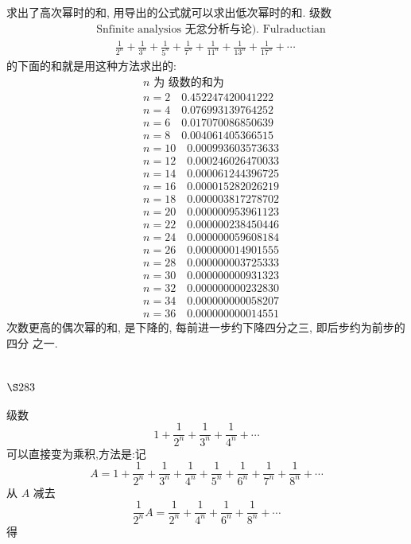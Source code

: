 求出了高次幂时的和, 用导出的公式就可以求出低次幂时的和. 级数 
\[
\begin{aligned}
& \text { Snfinite analysios 无忿分析与论). Fulraductian } \\
& \qquad \frac{1}{2^{n}}+\frac{1}{3^{n}}+\frac{1}{5^{n}}+\frac{1}{7^{n}}+\frac{1}{11^{n}}+\frac{1}{13^{n}}+\frac{1}{17^{n}}+\cdots
\end{aligned}
\]
的下面的和就是用这种方法求出的:
\[
\begin{aligned}
& n \text { 为 级数的和为 } \\
& n=2 \quad 0.452247420041222 \\
& n=4 \quad 0.076993139764252 \\
& n=6 \quad 0.017070086850639 \\
& n=8 \quad 0.004061405366515 \\
& n=10 \quad 0.000993603573633 \\
& n=12 \quad 0.000246026470033 \\
& n=14 \quad 0.000061244396725 \\
& n=16 \quad 0.000015282026219 \\
& n=18 \quad 0.000003817278702 \\
& n=20 \quad 0.000000953961123 \\
& n=22 \quad 0.000000238450446 \\
& n=24 \quad 0.000000059608184 \\
& n=26 \quad 0.000000014901555 \\
& n=28 \quad 0.000000003725333 \\
& n=30 \quad 0.000000000931323 \\
& n=32 \quad 0.000000000232830 \\
& n=34 \quad 0.000000000058207 \\
& n=36 \quad 0.000000000014551
\end{aligned}
\]
次数更高的偶次幂的和, 是下降的, 每前进一步约下降四分之三, 即后步约为前步的四分 之一.

\section{$\S 283$}

级数
\[
1+\frac{1}{2^{n}}+\frac{1}{3^{n}}+\frac{1}{4^{n}}+\cdots
\]
可以直接变为乘积,方法是:记
\[
A=1+\frac{1}{2^{n}}+\frac{1}{3^{n}}+\frac{1}{4^{n}}+\frac{1}{5^{n}}+\frac{1}{6^{n}}+\frac{1}{7^{n}}+\frac{1}{8^{n}}+\cdots
\]
从 $A$ 减去
\[
\frac{1}{2^{n}} A=\frac{1}{2^{n}}+\frac{1}{4^{n}}+\frac{1}{6^{n}}+\frac{1}{8^{n}}+\cdots
\]
得 

